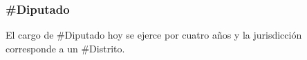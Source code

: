 \subsubsection{\#Diputado}

El cargo de \#Diputado hoy se ejerce por cuatro años y la jurisdicción
corresponde a un \#Distrito.

\begin{description}
  
\end{description}
